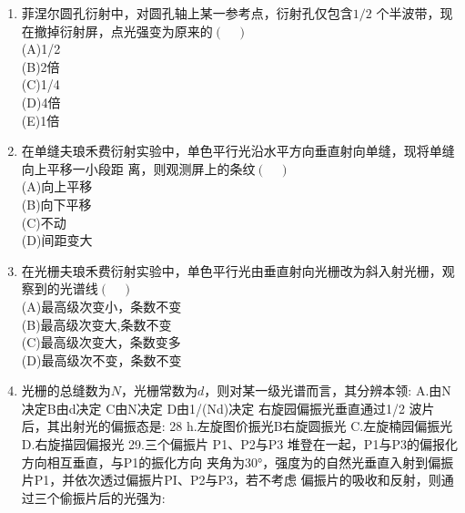 \begin{enumerate}
\item 菲涅尔圆孔衍射中，对圆孔轴上某一参考点，衍射孔仅包含$ 1/2$ 个半波带，现在撤掉衍射屏，点光强变为原来的$(\quad)$\\
(A)1/2\\
(B)2倍\\
(C)1/4\\
(D)4倍\\
(E)1倍
\item 在单缝夫琅禾费衍射实验中，单色平行光沿水平方向垂直射向单缝，现将单缝向上平移一小段距
离，则观测屏上的条纹$(\quad)$\\
(A)向上平移\\
(B)向下平移\\
(C)不动\\
(D)间距变大
\item 在光栅夫琅禾费衍射实验中，单色平行光由垂直射向光栅改为斜入射光栅，观察到的光谱线$(\quad)$\\
(A)最高级次变小，条数不变\\
(B)最高级次变大,条数不变\\
(C)最高级次变大，条数变多\\
(D)最高级次不变，条数不变
\item 光栅的总缝数为$N$，光栅常数为$d$，则对某一级光谱而言，其分辨本领:
A.由N决定B由d决定
C由N决定
D由1/(Nd)决定
右旋园偏振光垂直通过1/2 波片后，其出射光的偏振态是:
28
h.左旋图价振光B右旋圆振光
C.左旋楠园偏振光
D.右旋描园偏报光
29.三个偏振片 P1、P2与P3 堆登在一起，P1与P3的偏报化方向相互垂直，与P1的振化方向
夹角为30°，强度为的自然光垂直入射到偏振片P1，并依次透过偏振片PI、P2与P3，若不考虑
偏振片的吸收和反射，则通过三个偷振片后的光强为:
\end{enumerate}